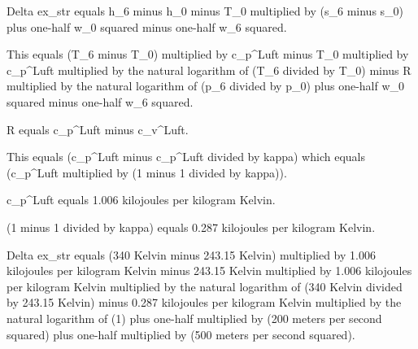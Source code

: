 Delta ex_str equals h_6 minus h_0 minus T_0 multiplied by (s_6 minus s_0) plus one-half w_0 squared minus one-half w_6 squared.  

This equals (T_6 minus T_0) multiplied by c_p^Luft minus T_0 multiplied by c_p^Luft multiplied by the natural logarithm of (T_6 divided by T_0) minus R multiplied by the natural logarithm of (p_6 divided by p_0) plus one-half w_0 squared minus one-half w_6 squared.  

R equals c_p^Luft minus c_v^Luft.  

This equals (c_p^Luft minus c_p^Luft divided by kappa) which equals (c_p^Luft multiplied by (1 minus 1 divided by kappa)).  

c_p^Luft equals 1.006 kilojoules per kilogram Kelvin.  

(1 minus 1 divided by kappa) equals 0.287 kilojoules per kilogram Kelvin.  

Delta ex_str equals (340 Kelvin minus 243.15 Kelvin) multiplied by 1.006 kilojoules per kilogram Kelvin minus 243.15 Kelvin multiplied by 1.006 kilojoules per kilogram Kelvin multiplied by the natural logarithm of (340 Kelvin divided by 243.15 Kelvin) minus 0.287 kilojoules per kilogram Kelvin multiplied by the natural logarithm of (1) plus one-half multiplied by (200 meters per second squared) plus one-half multiplied by (500 meters per second squared).